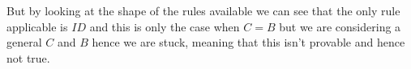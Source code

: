 \documentclass{article}
\begin{document}
But by looking at the shape of the rules available we can see that the only rule applicable is \(ID\) and this is only the case when \(C = B\) but we are considering a general \(C\) and \(B\) hence we are stuck, meaning that this isn't provable and hence not true.







\end{document}
